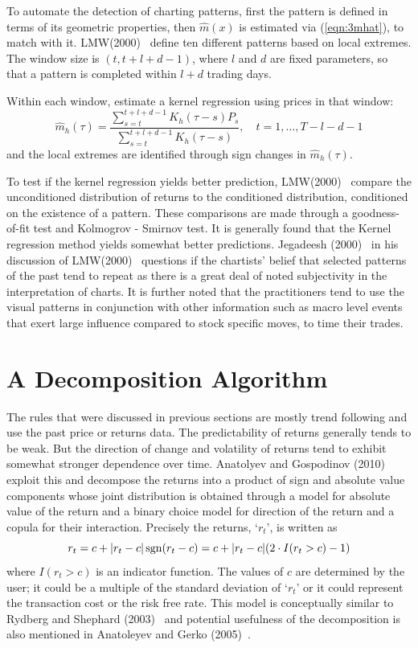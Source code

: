 To automate the detection of charting patterns, first the pattern is defined in terms of its geometric properties, then $\hat{m}(x)$ is estimated via (\ref{eqn:3mhat}), to match with it. LMW(2000)~\cite{LoMWang} define ten different patterns based on local extremes. The window size is $(t,t+l+d-1)$, where $l$ and $d$ are fixed parameters, so that a pattern is completed within $l+d$ trading days.


Within each window, estimate  a kernel regression using prices in that window:
	\begin{equation}\label{eqn:longhat}
	\hat{m}_{h}(\tau) = \dfrac{\sum_{s = t}^{t+l+d-1}K_{h}(\tau - s)P_{s}}{\sum_{s = t}^{t+l+d-1}K_{h}(\tau - s)}, \quad t = 1,\ldots , T-l-d-1
	\end{equation}
and the local extremes are identified through sign changes in $\hat{m}_{h}(\tau)$.


To test if the kernel regression yields better prediction, LMW(2000)~\cite{LoMWang} compare the unconditioned distribution of returns to the conditioned distribution, conditioned on the existence of a pattern. These comparisons are made through a goodness-of-fit test and Kolmogrov - Smirnov test. It  is generally found that the Kernel regression method yields somewhat better predictions. Jegadeesh (2000)~\cite{Jeqa} in his discussion of LMW(2000)~\cite{LoMWang} questions if the chartists' belief that selected patterns of the past tend to repeat as there is a great deal of noted subjectivity in the interpretation of charts. It is further noted that the practitioners tend to use the visual patterns in conjunction with other information such as macro level events that exert large influence compared to stock specific moves, to time their trades.


\section{A Decomposition Algorithm}


The rules that were discussed in previous sections are mostly trend following and use the past price or returns data. The predictability of returns generally tends to be weak. But the direction of change and volatility of returns tend to exhibit somewhat stronger dependence over time. Anatolyev and Gospodinov (2010)~\cite{Ananto2} exploit this and decompose the returns into a product of sign and absolute value components whose joint distribution is obtained through a model for absolute value of the return and a binary choice model for direction of the return and a copula for their interaction. Precisely the returns, `$r_{t}$', is written as
	\begin{equation}\label{eqn:3sgn}
	r_t = c + |r_t - c| \sgn (r_t - c)= c + |r_t - c| (2\cdot I(r_t >c) - 1)
	\end{equation}
where $I(r_t > c)$ is an indicator function. The values of $c$ are determined by the user; it could be a multiple of the standard deviation of `$r_{t}$' or it could represent the transaction cost or the risk free rate. This model is conceptually similar to Rydberg and Shephard (2003)~\cite{Ryd} and potential usefulness of the decomposition is also mentioned in Anatoleyev and Gerko (2005)~\cite{Ananto1}.


